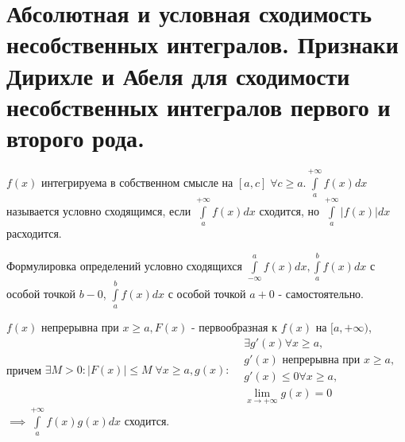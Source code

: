 \documentclass[../main.tex]{subfiles}
\begin{document}
\section{Абсолютная и условная сходимость несобственных интегралов. Признаки Дирихле и Абеля для сходимости несобственных интегралов первого и второго рода.}
\begin{definition}
    $f(x)$ интегрируема в собственном смысле на $[a,c]\;\forall c\geqslant a. \int\limits_{a  }^{+\infty}f(x)dx $ называется условно сходящимся, если $\int\limits_{a }^{+\infty}f(x)dx $ сходится, но $\int\limits_{a    }^{+\infty}|f(x)|dx $ расходится.
\end{definition}
Формулировка определений условно сходящихся $\int\limits_{-\infty}^{a}f(x)dx , \int\limits_{a   }^{b    } f(x)dx$ с особой точкой $b-0$, $\int\limits_{a    }^{b    } f(x)dx$ с особой точкой $a+0$ - самостоятельно.

\begin{theorem}
    $f(x)$ непрерывна при $x\geqslant a, F(x) $ - первообразная к $f(x) $ на $[a,+\infty)$, причем $\exists M>0: |F(x)|\leqslant M  \; \forall x\geqslant a, g(x): \begin{aligned} &\exists g'(x)\forall x\geqslant a,\\ &g'(x) \text{ непрерывна при } x\geqslant a,\\ &g'(x)\leqslant 0 \forall x \geqslant a,\\ &\lim\limits_{x\to +\infty}g(x)=0 \end{aligned}$ $\implies \int\limits_{a   }^{+\infty  } f(x)g(x)dx$ сходится.
\end{theorem}
\end{document}
